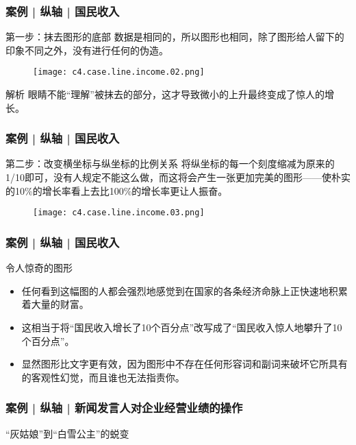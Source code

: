 \begin{frame}
  \frametitle{案例 | 纵轴 | 国民收入}
  \begin{block}{第一步：抹去图形的底部}
    数据是相同的，所以图形也相同，除了图形给人留下的印象不同之外，没有进行任何的伪造。
  \end{block}
  \vspace{-0.5em}
  \begin{figure}
    \centering
    \texttt{[image: c4.case.line.income.02.png]}
  \end{figure}
  \pause
  \vspace{-0.5em}
  \begin{block}{解析}
    眼睛不能“理解”被抹去的部分，这才导致微小的上升最终变成了惊人的增长。
  \end{block}
\end{frame}

\begin{frame}
  \frametitle{案例 | 纵轴 | 国民收入}
  \begin{block}{第二步：改变横坐标与纵坐标的比例关系}
    将纵坐标的每一个刻度缩减为原来的1/10即可，没有人规定不能这么做，而这将会产生一张更加完美的图形——使朴实的10\%的增长率看上去比100\%的增长率更让人振奋。
  \end{block}
  \vspace{-0.5em}
  \begin{figure}
    \centering
    \texttt{[image: c4.case.line.income.03.png]}
  \end{figure}
\end{frame}

\begin{frame}
  \frametitle{案例 | 纵轴 | 国民收入}
  \begin{block}{令人惊奇的图形}
    \begin{itemize}
      \item 任何看到这幅图的人都会强烈地感觉到在国家的各条经济命脉上正快速地积累着大量的财富。
      \item 这相当于将“国民收入增长了10个百分点”改写成了“国民收入惊人地攀升了10个百分点”。
      \item 显然图形比文字更有效，因为图形中不存在任何形容词和副词来破坏它所具有的客观性幻觉，而且谁也无法指责你。
    \end{itemize}
  \end{block}
\end{frame}

\begin{frame}
  \frametitle{案例 | 纵轴 | 新闻发言人对企业经营业绩的操作}
  \begin{block}{“灰姑娘”到“白雪公主”的蜕变}
    \begin{figure}
      \centering
    \end{figure}
  \end{block}
\end{frame}

